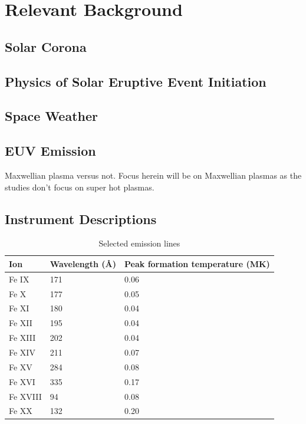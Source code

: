 \chapter{Relevant Background}
\label{chapterbackground}

\section{Solar Corona}

\section{Physics of Solar Eruptive Event Initiation}

\section{Space Weather}

\section{EUV Emission}
Maxwellian plasma versus not. Focus herein will be on Maxwellian plasmas as the studies don't focus on super hot plasmas. 

\section{Instrument Descriptions}

\begin{table}[!h]
    \caption[Selected emission lines and temperatures]{
    Selected emission lines
    }
    \begin{center}
    \begin{tabular}{|l|l|l|} \hline
	Ion & Wavelength (\AA) & Peak formation temperature (MK) \\ \hline \hline
	Fe IX & 171 & 0.06 \\ \hline
	Fe X & 177 & 0.05  \\ \hline
	Fe XI & 180 & 0.04 \\ \hline
	Fe XII & 195 & 0.04 \\ \hline
	Fe XIII & 202 & 0.04 \\ \hline
	Fe XIV & 211 & 0.07 \\ \hline
	Fe XV & 284 & 0.08 \\ \hline
	Fe XVI & 335 & 0.17 \\ \hline
	Fe XVIII & 94 & 0.08 \\ \hline
	Fe XX & 132 & 0.20 \\ \hline
	\end{tabular}
    \\ \rule{0mm}{5mm}
    \end{center}
    \label{tab:emissionlines}
\end{table}

